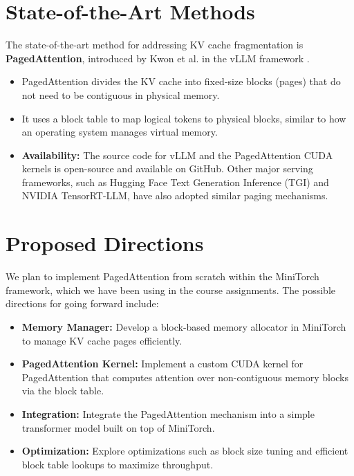 \documentclass{article}
\begin{document}
\section{State-of-the-Art Methods}
\label{sec:sota}

The state-of-the-art method for addressing KV cache fragmentation is \textbf{PagedAttention}, introduced by Kwon et al. in the vLLM framework \cite{kwon2023efficient}.

\begin{itemize}
    \item PagedAttention divides the KV cache into fixed-size blocks (pages) that do not need to be contiguous in physical memory.
    \item It uses a block table to map logical tokens to physical blocks, similar to how an operating system manages virtual memory.
    \item \textbf{Availability:} The source code for vLLM and the PagedAttention CUDA kernels is open-source and available on GitHub. Other major serving frameworks, such as Hugging Face Text Generation Inference (TGI) and NVIDIA TensorRT-LLM, have also adopted similar paging mechanisms.
\end{itemize}

\section{Proposed Directions}
\label{sec:directions}

We plan to implement PagedAttention from scratch within the MiniTorch framework, which we have been using in the course assignments. The possible directions for going forward include:

\begin{itemize}
    \item \textbf{Memory Manager:} Develop a block-based memory allocator in MiniTorch to manage KV cache pages efficiently.
    \item \textbf{PagedAttention Kernel:} Implement a custom CUDA kernel for PagedAttention that computes attention over non-contiguous memory blocks via the block table.
    \item \textbf{Integration:} Integrate the PagedAttention mechanism into a simple transformer model built on top of MiniTorch.
    \item \textbf{Optimization:} Explore optimizations such as block size tuning and efficient block table lookups to maximize throughput.
\end{itemize}
\end{document}
